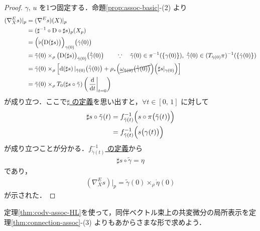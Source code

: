 \documentclass[geometry_main]{subfiles}
\begin{document}
\begin{proof}
    $\gamma,\, u$ を1つ固定する．命題\ref{prop:assoc-basic}-(2) より
    \begin{align}
        (\nabla^E_X s)|_p
        &= (\nabla^E s)(X)|_p \\
        &= (\sharp^{-1} \circ \codd{} \circ \sharp s)_p (X_p) \\
        &= \Bigl( \flat\bigl(\codd{(\sharp s)} \bigr)\Bigr)_{\gamma(0)} \bigl( \dot{\gamma}(0) \bigr) \\
        &= \tilde{\gamma}(0) \times_\rho \bigl(\codd{(\sharp s)}\bigr)_{\tilde{\gamma}(0)} \bigl( \dot{\tilde{\gamma}} (0) \bigr) \qquad \because\quad \tilde{\gamma}(0) \in \pi^{-1} (\{\gamma(0)\}),\; \dot{\tilde{\gamma}}(0) \in (T_{\tilde{\gamma}(0)} \pi)^{-1} (\{\dot{\gamma} (0)\})\\
        &= \tilde{\gamma}(0) \times_\rho \left[ \dd (\sharp s)|_{\tilde{\gamma}(0)} \bigl( \dot{\tilde{\gamma}}(0) \bigr)  + \rho_* \Bigl( \cancel{\omega_{\tilde{\gamma}(0)}\bigl(\dot{\tilde{\gamma}}(0)\bigr)} \Bigr)\Bigl( \sharp s|_{\gamma(0)} \Bigr)    \right] \\
        &= \tilde{\gamma}(0) \times_\rho T_0(\sharp s \circ \tilde{\gamma}) \left( \eval{\dv{}{t}}_{t=0} \right)
    \end{align}
    が成り立つ．ここで\hyperref[prop:assoc-basic]{$\sharp$ の定義}を思い出すと，$\forall t \in [0,\, 1]$ に対して
    \begin{align}
        \sharp s \circ \tilde{\gamma}(t) 
        &= f^{-1}_{\tilde{\gamma}(t)} \Bigl( s \circ \pi \bigl( \tilde{\gamma}(t) \bigr)  \Bigr) \\
        &= f^{-1}_{\tilde{\gamma}(t)} \Bigl( s \bigl( \gamma(t) \bigr) \Bigr)
    \end{align}
    が成り立つことが分かる．\hyperref[lem:assoc-basic]{$f^{-1}_{\tilde{\gamma}(t)}$ の定義}から
    \begin{align}
        \sharp s \circ \tilde{\gamma} = \eta
    \end{align}
    であり，
    \begin{align}
        (\nabla^E_X s)|_p = \tilde{\gamma}(0) \times_\rho \dot{\eta}(0)
    \end{align}
    が示された．
\end{proof}

定理\ref{thm:codv-assoc-HL}を使って，同伴ベクトル束上の共変微分の局所表示を定理\ref{thm:connection-assoc}-(3) よりもあからさまな形で求めよう．
\end{document}
